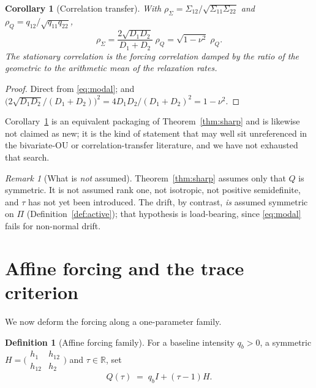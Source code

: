 \documentclass[11pt]{article}
\theoremstyle{plain}
\newtheorem{corollary}[theorem]{Corollary}
\theoremstyle{definition}
\newtheorem{definition}[theorem]{Definition}
\theoremstyle{remark}
\newtheorem{remark}[theorem]{Remark}
\newcommand{\Real}{\mathbb{R}}
\newcommand{\Sig}{\Sigma}
\begin{document}
\begin{corollary}[Correlation transfer]\label{cor:rho}
With $\rho_\Sig=\Sig_{12}/\sqrt{\Sig_{11}\Sig_{22}}$ and $\rho_Q=q_{12}/\sqrt{q_{11}q_{22}}$,
\begin{equation}
  \rho_\Sig = \frac{2\sqrt{D_1D_2}}{D_1+D_2}\;\rho_Q = \sqrt{1-\nu^2}\;\rho_Q. \label{eq:rho}
\end{equation}
The stationary correlation is the forcing correlation damped by the ratio of the geometric to
the arithmetic mean of the relaxation rates.
\end{corollary}

\begin{proof}
Direct from \eqref{eq:modal}; and $\bigl(2\sqrt{D_1D_2}/(D_1+D_2)\bigr)^2=4D_1D_2/(D_1+D_2)^2=1-\nu^2$.
\end{proof}

Corollary~\ref{cor:rho} is an equivalent packaging of Theorem~\ref{thm:sharp} and is likewise not
claimed as new; it is the kind of statement that may well sit unreferenced in the bivariate-OU or
correlation-transfer literature, and we have not exhausted that search.

\begin{remark}[What is \emph{not} assumed]
Theorem~\ref{thm:sharp} assumes only that $Q$ is symmetric. It is not assumed rank one, not
isotropic, not positive semidefinite, and $\tau$ has not yet been introduced. The drift, by
contrast, \emph{is} assumed symmetric on $\Pi$ (Definition~\ref{def:active}); that hypothesis is
load-bearing, since \eqref{eq:modal} fails for non-normal drift.
\end{remark}

\section{Affine forcing and the trace criterion}\label{sec:thm2}

We now deform the forcing along a one-parameter family.

\begin{definition}[Affine forcing family]\label{def:affine}
For a baseline intensity $q_b>0$, a symmetric $H=\bigl(\begin{smallmatrix}h_1&h_{12}\\ h_{12}&h_2\end{smallmatrix}\bigr)$
and $\tau\in\Real$, set
\begin{equation}
  Q(\tau) \;=\; q_b I + (\tau-1)H. \label{eq:affine}
\end{equation}
\end{definition}
\end{document}
